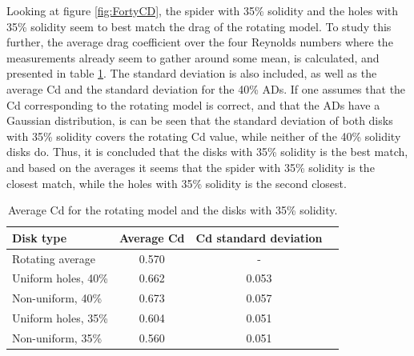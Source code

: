 

Looking at figure \ref{fig:FortyCD}, the \gls{spider} with 35\% solidity and the \gls{holes} with 35\% solidity seem to best match the drag of the rotating model. To study this further, the average drag coefficient over the four Reynolds numbers where the measurements already seem to gather around some mean, is calculated, and presented in table \ref{tab:AvgCD}. The standard deviation is also included, as well as the average Cd and the standard deviation for the 40\% \gls{AD}s. If one assumes that the Cd corresponding to the rotating model is correct, and that the \gls{AD}s have a Gaussian distribution, is can be seen that the standard deviation of both disks with 35\% solidity covers the rotating Cd value, while neither of the 40\% solidity disks do. Thus, it is concluded that the disks with 35\% solidity is the best match, and based on the averages it seems that the \gls{spider} with 35\% solidity is the closest match, while the \gls{holes} with 35\% solidity is the second closest.


\begin{table}
    \centering
    \begin{tabular}{l c c r}
         Disk type & Average Cd & Cd standard deviation \\
         \hline
         Rotating average & 0.570 & - \\
         Uniform holes, 40\% & 0.662 & 0.053 \\
         Non-uniform, 40\% & 0.673 & 0.057 \\
         Uniform holes, 35\% & 0.604 & 0.051 \\
         Non-uniform, 35\% & 0.560 & 0.051 \\
    \end{tabular}
    \caption{Average Cd for the rotating model and the disks with 35\% solidity.}
    \label{tab:AvgCD}
\end{table}







